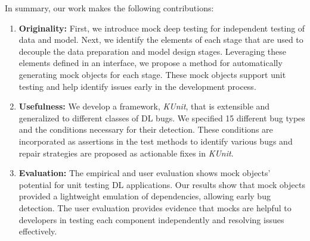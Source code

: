 In summary, our work makes the following 
contributions:
\begin{enumerate}
\item \textbf{Originality:}
First, we introduce mock deep testing for independent testing of data and model.
Next, we identify the elements of each stage that are used to decouple the data preparation and model design stages. Leveraging these elements defined in an interface, we propose a method for automatically generating mock objects for each stage. These mock objects support unit testing and help identify issues early in the development process.

\item \textbf{Usefulness:}
We develop a framework, {\em{KUnit}}, that is extensible and generalized to different classes of DL bugs.
We specified
15 different bug types and the conditions necessary for their detection. 
These conditions are incorporated as assertions in the test methods to identify various bugs and repair strategies are proposed 
as actionable fixes in {\em{KUnit}}.

\item \textbf{Evaluation:}
The empirical and user evaluation shows mock objects' potential for unit testing DL applications. Our results show that mock objects provided a lightweight emulation of dependencies, allowing early bug detection.
The user evaluation provides evidence that mocks are helpful to developers in testing each component independently and resolving issues effectively.

\end{enumerate}



